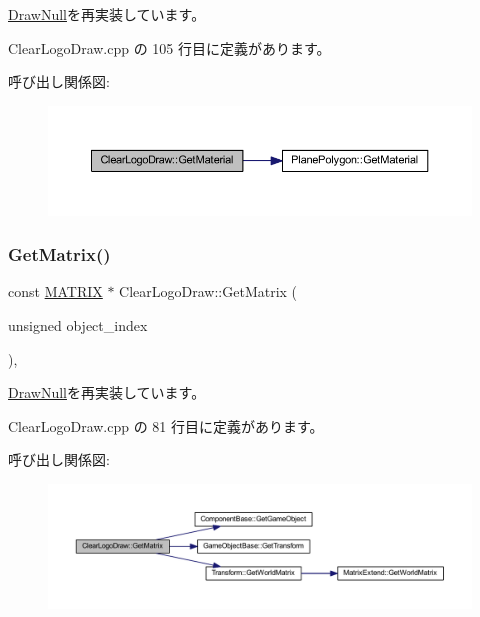 \mbox{\hyperlink{class_draw_null_a84969d22d3436986f214e9896fe44fc6}{Draw\+Null}}を再実装しています。



 Clear\+Logo\+Draw.\+cpp の 105 行目に定義があります。

呼び出し関係図\+:\nopagebreak
\begin{figure}[H]
\begin{center}
\leavevmode
\includegraphics[width=350pt]{class_clear_logo_draw_ab356bf5d56c10a6689e101b35c30d889_cgraph}
\end{center}
\end{figure}
\mbox{\label{class_clear_logo_draw_af5d12b717020101e5c956cf3574f0e2a}} 
\subsubsection{\texorpdfstring{Get\+Matrix()}{GetMatrix()}}
{\footnotesize\ttfamily const \mbox{\hyperlink{_vector3_d_8h_a032295cd9fb1b711757c90667278e744}{M\+A\+T\+R\+IX}} $\ast$ Clear\+Logo\+Draw\+::\+Get\+Matrix (\begin{DoxyParamCaption}\item[{unsigned}]{object\+\_\+index }\end{DoxyParamCaption})\hspace{0.3cm}{\ttfamily [override]}, {\ttfamily [virtual]}}



\mbox{\hyperlink{class_draw_null_adede079e9c11a756090740b20bb43022}{Draw\+Null}}を再実装しています。



 Clear\+Logo\+Draw.\+cpp の 81 行目に定義があります。

呼び出し関係図\+:\nopagebreak
\begin{figure}[H]
\begin{center}
\leavevmode
\includegraphics[width=350pt]{class_clear_logo_draw_af5d12b717020101e5c956cf3574f0e2a_cgraph}
\end{center}
\end{figure}
\mbox{\label{class_clear_logo_draw_a99aba47b4693f15498daf7df2bfee2d7}} 
